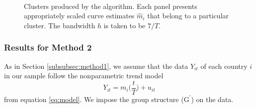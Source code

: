 \documentclass[a4paper,12pt]{article}
\numberwithin{equation}{section}
\begin{document}
\begin{figure}
\\
\hspace{0.25cm}
\caption{Clusters produced by the algorithm. Each panel presents appropriately scaled curve estimates $\hat{m}_i$ that belong to a particular cluster. The bandwidth $h$ is taken to be $7/T$.}\label{fig:clusters_14days}
\end{figure}

\subsubsection{Results for Method 2}

As in Section \ref{subsubsec:method1}, we assume that the data $Y_{it}$ of each country $i$ in our sample follow the nonparametric trend model 
\[ Y_{it} = m_i\Big(\frac{t}{T}\Big) + u_{it} \]
from equation \eqref{eq:model}. We impose the group structure ($\text{G}^\prime$) on the data. 
\end{document}
